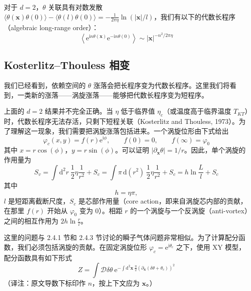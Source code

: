对于 $d=2$，$\theta$ 关联具有对数发散 $\langle \theta(\pmb{x})\theta(0)\rangle - \langle \theta(l)\theta(0)\rangle = -\frac{1}{2\pi\eta}\ln(|\pmb{x}|/l)$，我们有以下的代数长程序（algebraic long-range order）：
\begin{equation*}
\left\langle \mathrm{e}^{\mathrm{i}n\theta(\pmb{x})}\mathrm{e}^{-\mathrm{i}n\theta(0)} \right\rangle \sim |\pmb{x}|^{-n^{2}/2\pi\eta}
\tag{3.4.4}
\end{equation*}

\subsection{Kosterlitz--Thouless 相变}
\begin{keypoints}
\item 我们已经看到，依赖空间的 $\theta$ 涨落会把长程序变为代数长程序。这里我们将看到，一类新的涨落——涡旋涨落——能够把代数长程序变为短程序。
\end{keypoints}

上面的 $d=2$ 结果并不完全正确。当 $\eta$ 低于临界值 $\eta_{c}$（或温度高于临界温度 $T_{KT}$）时，代数长程序无法存活，只剩下短程关联（Kosterlitz and Thouless, 1973）。为了理解这一现象，我们需要把涡旋涨落包括进来。一个涡旋位形由下式给出
\begin{equation*}
\varphi_{c}(x,y) = f(r)\mathrm{e}^{\mathrm{i}\phi}, \qquad f(0)=0, \qquad f(\infty)=\varphi_{0}
\end{equation*}
其中 $x = r\cos(\phi)$，$y = r\sin(\phi)$。可以证明 $|\partial_{\pmb{x}}\theta| = 1/r$。因此，单个涡旋的作用量为
\begin{equation*}
S_{v} = \int \mathrm{d}^{2}r\ \frac{1}{2}\eta\frac{1}{r^{2}} + S_{c}
= \int \pi\,\mathrm{d}(r^{2})\ \frac{1}{2}\eta\frac{1}{r^{2}} + S_{c}
= h\ln\frac{L}{l} + S_{c}
\end{equation*}
其中
\begin{equation*}
h = \eta\pi,
\end{equation*}
$l$ 是短距离截断尺度，$S_{c}$ 是芯部作用量（core action，即来自涡旋芯内部的贡献，在那里 $f(r)$ 开始从 $\varphi_{0}$ 变为 0）。相距 $r$ 的一个涡旋与一个反涡旋（anti-vortex）之间的相互作用为 $2h\ln\frac{r}{l}$。

这里的问题与 2.4.1 节和 2.4.3 节讨论的瞬子气体问题非常相似。为了计算配分函数，我们必须包括涡旋的贡献。在固定涡旋位形 $\varphi_{c} = \mathrm{e}^{\mathrm{i}\theta_{c}}$ 之下，使用 XY 模型，配分函数具有如下形式
\begin{equation*}
Z = \int \mathcal{D}\delta\theta\ \mathrm{e}^{-\int \mathrm{d}^{2}\pmb{x}\ \frac{\eta}{2}\left(\partial_{\pmb{x}}(\delta\theta+\theta_{c})\right)^{2}}
\end{equation*}
（译注：原文导数下标印作 $n$，按上下文应为 $\pmb{x}$。）


